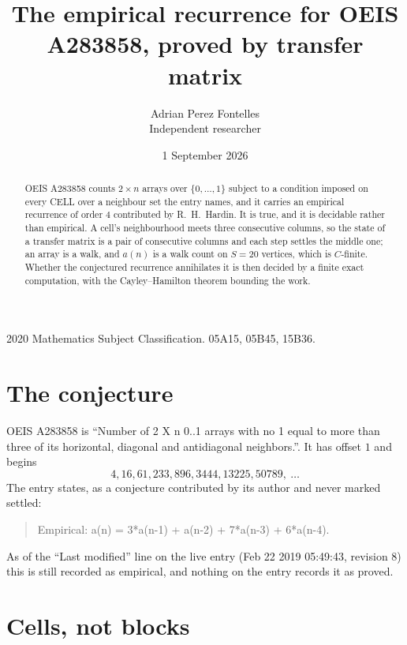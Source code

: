 \documentclass[11pt,a4paper]{article}
\title{The empirical recurrence for OEIS A283858, proved by transfer matrix}
\author{Adrian Perez Fontelles\\ \small Independent researcher}
\date{1 September 2026}
\theoremstyle{plain}
\theoremstyle{definition}
\begin{document}
\maketitle

\begin{abstract}
OEIS A283858 counts $2\times n$ arrays over $\{0,\dots,1\}$ subject to a condition imposed on
every CELL over a neighbour set the entry names, and it carries an empirical recurrence of
order $4$ contributed by R.~H.~Hardin. It is true, and it is decidable rather than
empirical. A cell's neighbourhood meets three consecutive columns, so the state of a transfer
matrix is a pair of consecutive columns and each step settles the middle one; an array is a
walk, and $a(n)$ is a walk count on $S=20$ vertices, which is $C$-finite. Whether the
conjectured recurrence annihilates it is then decided by a finite exact computation, with the
Cayley--Hamilton theorem bounding the work.
\end{abstract}

\noindent\small 2020 Mathematics Subject Classification. 05A15, 05B45, 15B36.\normalsize

\section{The conjecture}

OEIS A283858 is ``Number of 2 X n 0..1 arrays with no 1 equal to more than three of its horizontal, diagonal and antidiagonal neighbors.''. It has offset $1$ and begins
\[
4, 16, 61, 233, 896, 3444, 13225, 50789,\ \dots
\]
The entry states, as a conjecture contributed by its author and never marked settled:
\begin{quote}
Empirical: a(n) = 3*a(n-1) + a(n-2) + 7*a(n-3) + 6*a(n-4).
\end{quote}
As of the ``Last modified'' line on the live entry (Feb 22 2019 05:49:43, revision 8) this is still
recorded as empirical, and nothing on the entry records it as proved.

\section{Cells, not blocks}
\end{document}
